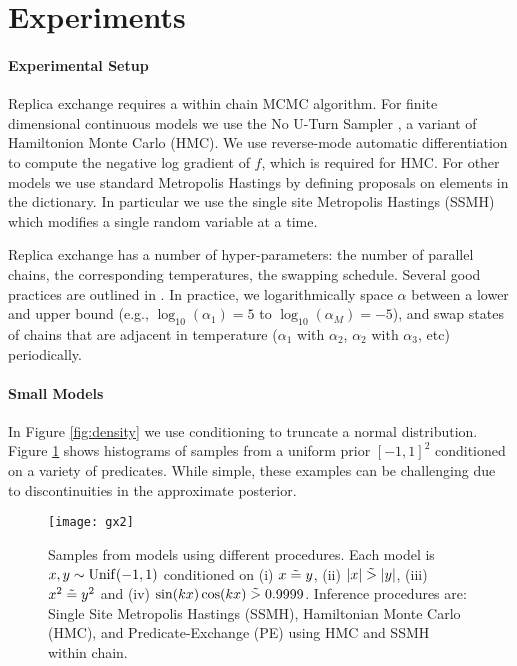 
\section{Experiments}\label{experiments}

\paragraph{Experimental Setup}Replica exchange requires a within chain MCMC algorithm.
For finite dimensional continuous models we use the No U-Turn Sampler \cite{hoffman2014no}, a variant of Hamiltonion Monte Carlo (HMC).
We use reverse-mode automatic differentiation \cite{griewank2008evaluating} to compute the negative log gradient of $f$, which is required for HMC.
For other models we use standard Metropolis Hastings by defining proposals on elements in the dictionary.
In particular we use the single site Metropolis Hastings (SSMH) \cite{wingate2011lightweight} which modifies a single random variable at a time.

Replica exchange has a number of hyper-parameters: the number of parallel chains, the corresponding temperatures, the swapping schedule.
Several good practices are outlined in \cite{earl2005parallel}.  In practice, we logarithmically space $\alpha$ between a lower and upper bound (e.g., $\log_{10}(\alpha_1) = 5$ to $\log_{10}(\alpha_M) = -5$), and swap states of chains that are adjacent in temperature ($\alpha_1$ with $\alpha_2$, $\alpha_2$ with $\alpha_3$, etc) periodically.


\paragraph{Small Models}
In Figure \ref{fig:density} we use conditioning to truncate a normal distribution. Figure  \ref{gridn} shows histograms of samples from a uniform prior  $[-1, 1]^2$ conditioned on a variety of predicates.  While simple, these examples can be challenging due to discontinuities in the approximate posterior.



\begin{figure}[!htb]
	\centering
	\texttt{[image: gx2]}
	\caption{Samples from models using different procedures.  Each model is $x,y \sim \operatorname{Unif}(-1,1)$ conditioned on (i) $x \mathrel{\tilde{=}} y$, (ii) $|x| \mathrel{\tilde{>}} |y|$, (iii) $x^2 \mathrel{\tilde{=}} y^2$ and (iv) $\sin(kx)\cos(kx) \mathrel{\tilde{>}} 0.9999$.
	Inference procedures are: Single Site Metropolis Hastings (SSMH), Hamiltonian Monte Carlo (HMC), and Predicate-Exchange (PE) using HMC and SSMH within chain.}
	\label{gridn}
	\vspace{-1em}
\end{figure}	

